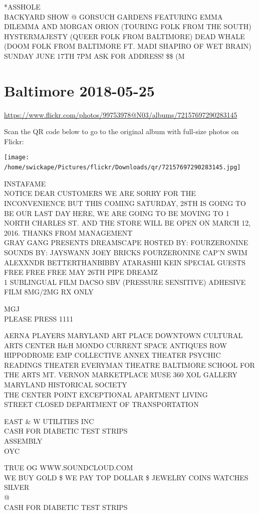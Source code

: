\documentclass[10pt,letterpaper]{article}
\begin{document}
*ASSHOLE\\
BACKYARD SHOW @ GORSUCH GARDENS FEATURING EMMA DILEMMA AND MORGAN ORION (TOURING FOLK FROM THE SOUTH) HYSTERMAJESTY (QUEER FOLK FROM BALTIMORE) DEAD WHALE (DOOM FOLK FROM BALTIMORE FT. MADI SHAPIRO OF WET BRAIN) SUNDAY JUNE 17TH 7PM ASK FOR ADDRESS! \$\$ (M
\

\section*{Baltimore 2018-05-25}

\url{https://www.flickr.com/photos/99753978@N03/albums/72157697290283145}

Scan the QR code below to go to the original album with full-size photos on Flickr:

\texttt{[image: /home/swickape/Pictures/flickr/Downloads/qr/72157697290283145.jpg]}
\

INSTAFAME\\
NOTICE DEAR CUSTOMERS WE ARE SORRY FOR THE INCONVENIENCE BUT THIS COMING SATURDAY, 28TH IS GOING TO BE OUR LAST DAY HERE, WE ARE GOING TO BE MOVING TO 1 NORTH CHARLES ST. AND THE STORE WILL BE OPEN ON MARCH 12, 2016.  THANKS FROM MANAGEMENT\\
GRAY GANG PRESENTS DREAMSCAPE HOSTED BY: FOURZERONINE SOUNDS BY: JAYSWANN JOEY BRICKS FOURZERONINE CAP'N SWIM ALEXXNDR BETTERTHANBIBBY ATARASHII KEIN SPECIAL GUESTS FREE FREE FREE MAY 26TH PIPE DREAMZ\\
1 SUBLINGUAL FILM DACSO SBV (PRESSURE SENSITIVE) ADHESIVE FILM 8MG/2MG RX ONLY

MGJ\\
PLEASE PRESS 1111

AERNA PLAYERS MARYLAND ART PLACE DOWNTOWN CULTURAL ARTS CENTER H\&H MONDO CURRENT SPACE ANTIQUES ROW\\
HIPPODROME EMP COLLECTIVE ANNEX THEATER PSYCHIC READINGS THEATER EVERYMAN THEATRE BALTIMORE SCHOOL FOR THE ARTS MT. VERNON MARKETPLACE MUSE 360 XOL GALLERY MARYLAND HISTORICAL SOCIETY\\
THE CENTER POINT EXCEPTIONAL APARTMENT LIVING\\
STREET CLOSED DEPARTMENT OF TRANSPORTATION

EAST  \& W UTILITIES INC\\
CASH FOR DIABETIC TEST STRIPS\\
ASSEMBLY\\
OYC

TRUE OG WWW.SOUNDCLOUD.COM\\
WE BUY GOLD \$ WE PAY TOP DOLLAR \$ JEWELRY COINS WATCHES SILVER\\
@\\
CASH FOR DIABETIC TEST STRIPS
\end{document}
